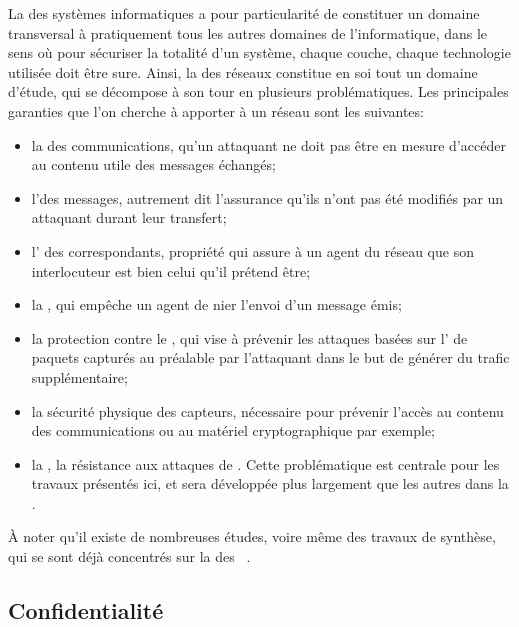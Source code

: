 La \secu des systèmes informatiques a pour particularité de constituer un domaine transversal à pratiquement tous les autres domaines de l'informatique, dans le sens où pour sécuriser la totalité d'un système, chaque couche, chaque technologie utilisée doit être sure.
Ainsi, la \secu des réseaux constitue en soi tout un domaine d'étude, qui se décompose à son tour en plusieurs problématiques.
Les principales garanties que l'on cherche à apporter à un réseau sont les suivantes:
\begin{itemize}
    \item la  des communications, \cad qu'un attaquant ne doit pas être en mesure d'accéder au contenu utile des messages échangés;
    \item l'\integrite des messages, autrement dit l'assurance qu'ils n'ont pas été modifiés par un attaquant durant leur transfert;
    \item l' des correspondants, propriété qui assure à un agent du réseau que son interlocuteur est bien celui qu'il prétend être;
    \item la , qui empêche un agent de nier l'envoi d'un message émis;
    \item la protection contre le , qui vise à prévenir les attaques basées sur l' de paquets capturés au préalable par l'attaquant dans le but de générer du trafic supplémentaire;
    \item la sécurité physique des capteurs, nécessaire pour prévenir l'accès au contenu des communications ou au matériel cryptographique par exemple;
    \item la \label{ea:def:dispo}, \cad la résistance aux attaques de \dds. Cette problématique est centrale pour les travaux présentés ici, et sera développée plus largement que les autres dans la .
\end{itemize}
À noter qu'il existe de nombreuses études, voire même des travaux de synthèse, qui se sont déjà concentrés sur la \secu des \rcs~\cite{DYK12,AD14}.

\subsection{Confidentialité}

